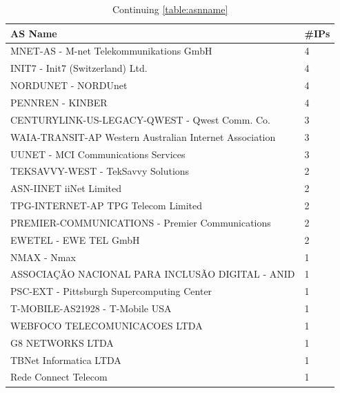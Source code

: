 \begin{table}[!h]
	\centering
	\caption{Continuing \cref{table:asnname}}
	\label{table:asn2name}
	\begin{tabular}{lp{2cm}}
  		\toprule
  		\textbf{AS Name} & \textbf{\#IPs} \\ 
  		\midrule
		MNET-AS - M-net Telekommunikations GmbH                                &            4 \\
		INIT7 - Init7 (Switzerland) Ltd.                               &                    4 \\
		NORDUNET - NORDUnet                                      &                          4 \\
		PENNREN - KINBER                                        &                           4 \\
		CENTURYLINK-US-LEGACY-QWEST - Qwest Comm. Co.    &                    3 \\
		WAIA-TRANSIT-AP Western Australian Internet Association     &                       3 \\
		UUNET - MCI Communications Services           &                                    3 \\
		TEKSAVVY-WEST - TekSavvy Solutions             &                                    2 \\
		ASN-IINET iiNet Limited                        &                                    2 \\
		TPG-INTERNET-AP TPG Telecom Limited              &                                  2 \\
		PREMIER-COMMUNICATIONS - Premier Communications       &                             2 \\
		EWETEL - EWE TEL GmbH                                 &                             2 \\
		NMAX - Nmax                                            &                            1 \\
		ASSOCIAÇÃO NACIONAL PARA INCLUSÃO DIGITAL - ANID        &                           1 \\
		PSC-EXT - Pittsburgh Supercomputing Center              &                           1 \\
		T-MOBILE-AS21928 - T-Mobile USA                      &                              1 \\
		WEBFOCO TELECOMUNICACOES LTDA                        &                              1 \\
		G8 NETWORKS LTDA                                      &                             1 \\
		TBNet Informatica LTDA                                &                             1 \\
		Rede Connect Telecom                                  &                             1 \\
  		\bottomrule
\end{tabular}
\end{table}

